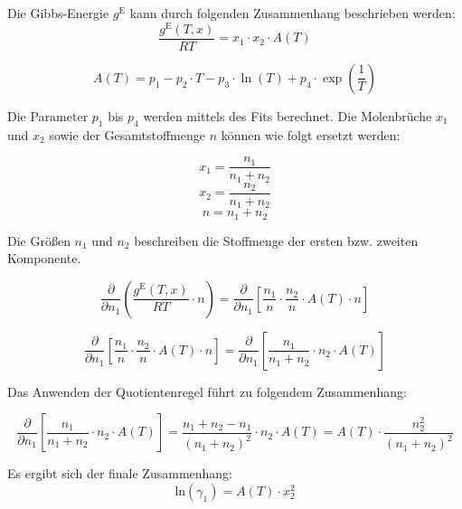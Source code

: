 \documentclass[../thesis.tex]{subfiles}
\begin{document}
Die Gibbs-Energie $ g^{\mathrm{E}} $ kann durch folgenden Zusammenhang beschrieben werden:
\begin{equation}
	\dfrac{g^{\mathrm{E}}(T,x)}{RT} = x_1 \cdot x_2 \cdot A(T) 
\end{equation}

\begin{equation}
	A(T) = p_1 - p_2 \cdot T-p_3 \cdot \ln(T)+p_4 \cdot \exp{ \left( \dfrac{1}{T} \right)}
\end{equation}

Die Parameter $ p_1 $ bis $ p_4 $ werden mittels des Fits berechnet.
Die Molenbrüche $ x_1 $ und $ x_2 $ sowie der Gesamtstoffmenge $ n $ können wie folgt ersetzt werden:

\begin{equation}
	x_1 = \dfrac{n_1}{n_1 + n_2}
\end{equation}  
\begin{equation}
	x_2 = \dfrac{n_2}{n_1 + n_2}
\end{equation}  
\begin{equation}
	n = n_1 + n_2
\end{equation}

Die Größen $ n_1 $ und $ n_2 $ beschreiben die Stoffmenge der ersten bzw. zweiten Komponente.

\begin{equation}
	\dfrac{\partial }{\partial n_1} \left( \dfrac{g^{\mathrm{E}}(T,x)}{RT} \cdot n \right) = \dfrac{\partial }{\partial n_1} \left[ 
	\dfrac{n_1}{n} \cdot \dfrac{n_2}{n} \cdot A(T) \cdot n
	 \right]  
\end{equation}

\begin{equation}
	\dfrac{\partial }{\partial n_1} \left[ 
	\dfrac{n_1}{n} \cdot \dfrac{n_2}{n} \cdot A(T) \cdot n
	\right]  = \dfrac{\partial }{\partial n_1} \left[ 
	\dfrac{n_1}{n_1 + n_2} \cdot n_2 \cdot A(T)
	\right] 
\end{equation}

Das Anwenden der Quotientenregel führt zu folgendem Zusammenhang:

\begin{equation}
	\dfrac{\partial }{\partial n_1} \left[ 
	\dfrac{n_1}{n_1 + n_2} \cdot n_2 \cdot A(T) \right] = \dfrac{n_1 + n_2 - n_1}{(n_1 + n_2)^2} \cdot n_2 \cdot A(T) = A(T) \cdot \dfrac{n_2^2}{(n_1 + n_2)^2}
\end{equation}

Es ergibt sich der finale Zusammenhang:
\begin{equation}
	\mathrm{ln}(\gamma_1) = A(T) \cdot x_2^2
\end{equation}
\end{document}

